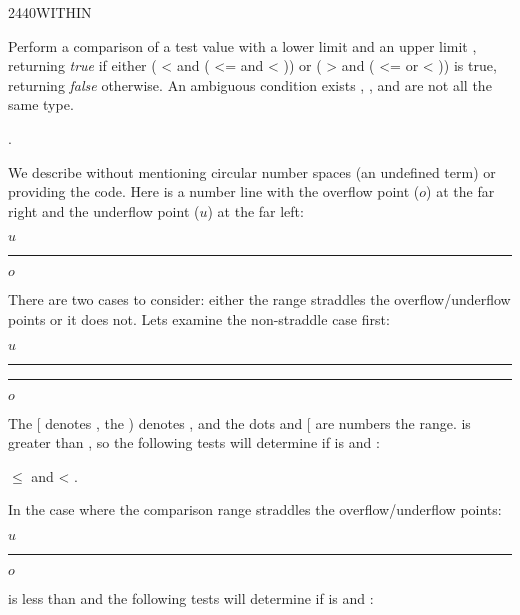 \begin{worddef}{2440}{WITHIN}
\item {}

	Perform a comparison of a test value  with a
	lower limit  and an upper limit
	, returning \emph{true} if either
	( <   and
	( <=  and
	  <  )) or
	( >   and
	( <=  or
	  <  )) is true, returning
	\emph{false} otherwise. An ambiguous condition exists
	, , and  are not
	all the same type.

\see {}.

	\begin{rationale} %
		We describe  without mentioning circular number
		spaces (an undefined term) or providing the code. Here is a
		number line with the overflow point ($o$) at the far right and
		the underflow point ($u$) at the far left:
		\begin{center}
			$u$\rule[.5ex]{15em}{.4pt}$o$
		\end{center}
		There are two cases to consider: either the
		 range straddles the overflow/underflow
		points or it does not. Lets examine the non-straddle case
		first:
		\begin{center}
			$u$\rule[.5ex]{5em}{.4pt}\makebox[5em]{[\dotfill)}\rule[.5ex]{5em}{.4pt}$o$
		\end{center}
		The [ denotes , the ) denotes ,
		and the dots and [ are numbers  the range.
		 is greater than , so the
		following tests will determine if  is
		  and :
		\begin{center}
			 $\le$  and  < .
		\end{center}
		In the case where the comparison range straddles the
		overflow/underflow points:
		\begin{center}
			$u$\makebox[5em]{\dotfill)}\rule[.5ex]{5em}{.4pt}\makebox[5em]{[\dotfill}$o$
		\end{center}
		 is less than  and the following
		tests will determine if  is 
		 and :

\end{rationale}
\end{worddef}
